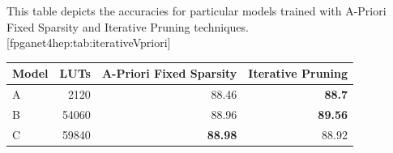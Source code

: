 \begin{table}
    \begin{sidecaption}{%
        This table depicts the accuracies for particular models trained with A-Priori Fixed Sparsity and Iterative Pruning techniques. 
    }[fpganet4hep:tab:iterativeVpriori]
\begin{threeparttable}
\begin{tabular}{lrrr}
\hline
Model & LUTs  & A-Priori Fixed Sparsity & Iterative Pruning \\ \hline
A     & 2120  & 88.46                   & \textbf{88.7}     \\
B     & 54060 & 88.96                   & \textbf{89.56}    \\
C     & 59840 & \textbf{88.98}          & 88.92          \\    \hline 
    \end{tabular}
\end{threeparttable}
\end{sidecaption}
\end{table}






